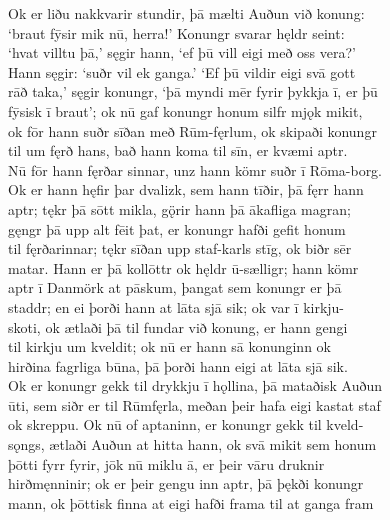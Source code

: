 \documentclass[12pt,letterpaper]{book}
\begin{document}
\begin{linenumbers}
Ok er liðu nakkvarir stundir, þā mælti Auðun við konung:\\
`braut fȳsir mik nū, herra!'  Konungr svarar hęldr seint:\\
`hvat villtu þā,' sęgir hann, `ef þū vill eigi með oss vera?'\\
Hann sęgir: `suðr vil ek ganga.'  `Ef þū vildir eigi svā gott\\
rāð taka,' sęgir konungr, `þā myndi mēr fyrir þykkja ī, er þū\\
fȳsisk ī braut'; ok nū gaf konungr honum silfr mjǫk mikit,\\
ok fōr hann suðr sīðan með Rūm-fęrlum, ok skipaði konungr\\
til um fęrð hans, bað hann koma til sīn, er kvæmi aptr.\\
Nū fōr hann fęrðar sinnar, unz hann kömr suðr ī Rōma-borg.\\
Ok er hann hęfir þar dvalizk, sem hann tīðir, þā fęrr hann\\
aptr; tękr þā sōtt mikla, gǫ̈rir hann þā ākafliga magran;\\
gęngr þā upp alt fēit þat, er konungr hafði gefit honum\\
til fęrðarinnar; tękr sīðan upp staf-karls stīg, ok biðr sēr\\
matar.  Hann er þā kollōttr ok hęldr ū-sælligr; hann kömr\\
aptr ī Danmörk at pāskum, þangat sem konungr er þā\\
staddr; en ei þorði hann at lāta sjā sik; ok var ī kirkju-\\
skoti, ok ætlaði þā til fundar við konung, er hann gengi\\
til kirkju um kveldit; ok nū er hann sā konunginn ok\\
hirðina fagrliga būna, þā þorði hann eigi at lāta sjā sik.\\
Ok er konungr gekk til drykkju ī hǫllina, þā mataðisk Auðun\\
ūti, sem siðr er til Rūmfęrla, meðan þeir hafa eigi kastat staf\\
ok skreppu.  Ok nū of aptaninn, er konungr gekk til kveld-\\
sǫngs, ætlaði Auðun at hitta hann, ok svā mikit sem honum\\
þōtti fyrr fyrir, jōk nū miklu ā, er þeir vāru druknir\\
hirðmęnninir; ok er þeir gengu inn aptr, þā þękði konungr\\
mann, ok þōttisk finna at eigi hafði frama til at ganga fram\\

\end{linenumbers}
\end{document}
